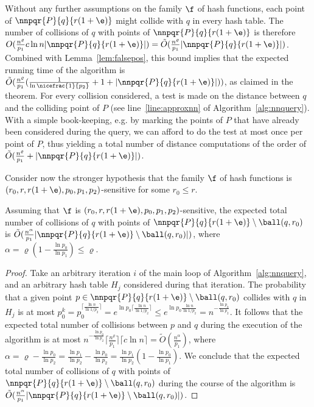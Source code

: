 Without any further assumptions on the family $\f$ of hash functions,
each point of $\nnpqr{P}{q}{r(1+\e)}$ might collide with $q$ in every
hash table. The number of collisions of $q$ with points of
$\nnpqr{P}{q}{r(1+\e)}$ is therefore $O(\frac{n^\varrho}{p_1} c\ln n
|\nnpqr{P}{q}{r(1+\e)}|) = \tilde
O(\frac{n^\varrho}{p_1}|\nnpqr{P}{q}{r(1+\e)}|)$. Combined with
Lemma~\ref{lem:falsepos}, this bound implies that the expected running
time of the algorithm is $\tilde O(\frac{n^\varrho}{p_1}
(\frac{1}{\ln\nicefrac{1}{p_2}}+1+|\nnpqr{P}{q}{r(1+\e)}|))$,
as claimed in the theorem.
For every collision considered, a test is made on the distance between
$q$ and the colliding point of $P$ (see line~\ref{line:approxnn} of
Algorithm~\ref{alg:nnquery}). With a simple book-keeping, e.g. by
marking the points of $P$ that have already been considered during the
query, we can afford to do the test at most once per point of $P$,
thus yielding a total number of distance computations of the order of
$\tilde O(\frac{n^\varrho}{p_1} + |\nnpqr{P}{q}{r(1+\e)}|)$.

Consider now the stronger hypothesis that the family $\f$ of hash
functions is $(r_0, r, r(1+\e), p_0, p_1, p_2)$-sensitive for some
$r_0\leq r$.
\begin{lem} \label{lem:realpos}
Assuming that $\f$ is $(r_0, r, r(1+\e), p_0, p_1, p_2)$-sensitive,
the expected total number of collisions of $q$ with points of
$\nnpqr{P}{q}{r(1+\e)}\setminus \ball(q,r_0)$ is $\tilde
O(\frac{n^\alpha}{p_1} |\nnpqr{P}{q}{r(1+\e)}\setminus
\ball(q,r_0)|)$, where $\alpha=\varrho(1-\frac{\ln p_0}{\ln
  p_1})\leq\varrho$.
\end{lem}
\begin{proof}
 Take an arbitrary iteration $i$ of the main loop of
 Algorithm~\ref{alg:nnquery}, and an arbitrary hash table $H_j$
 considered during that iteration. The probability that a given point
 $p\in \nnpqr{P}{q}{r(1+\e)}\setminus \ball(q,r_0)$ collides with $q$
 in $H_j$ is at most $p_0^k = p_0^{\lceil\frac{\ln n}{\ln
     1/p_2}\rceil} = e^{\ln p_0\lceil\frac{\ln n}{\ln 1/p_2}\rceil}
 \leq e^{\ln p_0 \frac{\ln n}{\ln 1/p_2}} = 
 n^{-\frac{\ln p_0}{\ln p_2}}$.  It follows that the expected total
 number of collisions between $p$ and $q$ during the execution of the
 algorithm is at most $n^{-\frac{\ln p_0}{\ln p_2}}
 \lceil \frac{n^\varrho}{p_1}\rceil \lceil c\ln n\rceil = \tilde
 O(\frac{n^\alpha}{p_1})$, where $\alpha=\varrho-\frac{\ln p_0}{\ln
   p_2} = \frac{\ln p_1}{\ln p_2}-\frac{\ln p_0}{\ln p_2} = \frac{\ln
   p_1}{\ln p_2} (1 - \frac{\ln p_0}{\ln p_1})$. We conclude that the
 expected total number of collisions of $q$ with points of
 $\nnpqr{P}{q}{r(1+\e)}\setminus \ball(q,r_0)$ during the course of
 the algorithm is $\tilde O(\frac{n^\alpha}{p_1}
 |\nnpqr{P}{q}{r(1+\e)}\setminus \ball(q,r_0)|)$.
\end{proof}

